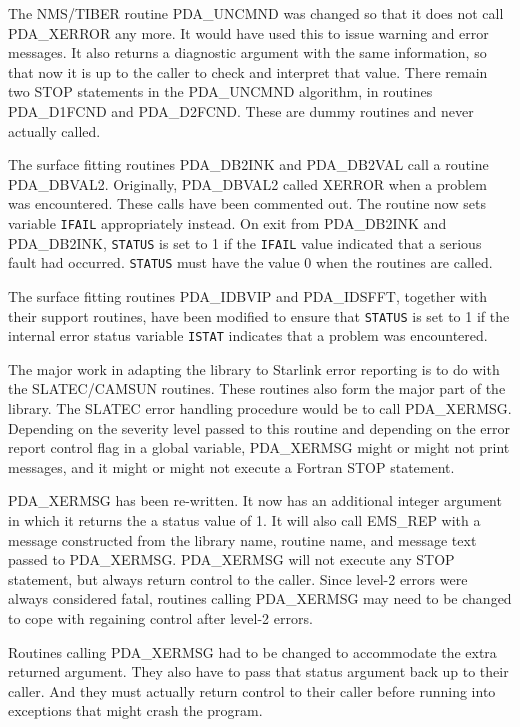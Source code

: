\documentclass[11pt,twoside]{article}
\newcommand{\htmlref}[2]{#1}
\newcommand{\xref}[3]{#1}
\begin{document}
   The NMS/TIBER routine PDA\_UNCMND was changed so that it does not
   call PDA\_XERROR any more. It would have used this to issue warning
   and error messages. It also returns a diagnostic argument with the
   same information, so that now it is up to the caller to check and
   interpret that value. There remain two STOP statements in the
   PDA\_UNCMND algorithm, in routines PDA\_D1FCND and PDA\_D2FCND. These
   are dummy routines and never actually called.

The surface fitting routines PDA\_DB2INK and PDA\_DB2VAL call a
routine PDA\_DBVAL2. Originally, PDA\_DBVAL2 called XERROR when a
problem was encountered. These calls have been commented out. The
routine now sets variable {\tt IFAIL} appropriately instead. On exit from
PDA\_DB2INK and PDA\_DB2INK, {\tt STATUS} is set to 1 if the
{\tt IFAIL} value indicated that a serious fault had occurred.
{\tt STATUS} must have the
value 0 when the routines are called.

The surface fitting routines PDA\_IDBVIP and PDA\_IDSFFT, together
with their support routines, have been modified to ensure that {\tt STATUS}
is set to 1 if the internal error status variable {\tt ISTAT} indicates
that a problem was encountered.

   The major work in adapting the library to Starlink error reporting is
   to do with the SLATEC/\-CAMSUN routines. These routines also form the
   major part of the library. The SLATEC error handling procedure would
   be to call
\htmlref{PDA\_XERMSG.}{PDA\_XERMSG}
   Depending on the severity level passed to this routine and depending
   on the error report control flag in a global variable, PDA\_XERMSG might
   or might not print messages, and it might or might not execute a
   Fortran STOP statement.

   PDA\_XERMSG has been re-written. It now has an additional integer argument
   in which it returns the a status value of 1. It will
   also call
\xref{EMS\_REP}{ssn4}{EMS\_REP}
   with a message constructed from the library name, routine name, and
   message text passed to PDA\_XERMSG. PDA\_XERMSG will not execute any STOP
   statement, but always return control to the caller. Since level-2
   errors were always considered fatal, routines calling PDA\_XERMSG may need
   to be changed to cope with regaining control after level-2 errors.

   Routines calling PDA\_XERMSG had to be changed to accommodate the extra
   returned argument. They also have to pass that status argument back
   up to their caller. And they must actually return control to their
   caller before running into exceptions that might crash the program.
\end{document}
